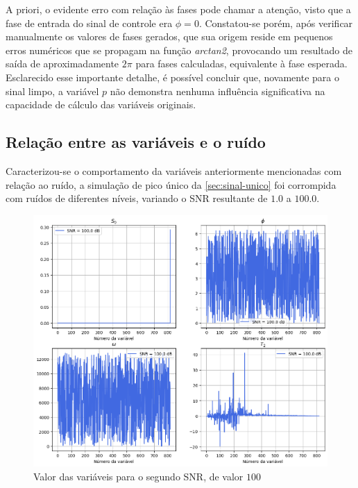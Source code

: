 \documentclass[12pt]{article}
\begin{document}
A priori, o evidente erro com relação às fases pode chamar a atenção, visto que a fase de entrada do sinal de controle era $\phi = 0$.
Constatou-se porém, após verificar manualmente os valores de fases gerados, que sua origem reside em pequenos erros numéricos que se propagam na função 
\textit{arctan2}, provocando um resultado de saída de aproximadamente $2\pi$ para fases calculadas, equivalente à fase esperada. Esclarecido esse 
importante detalhe, é possível concluir que, novamente para o sinal limpo, a variável $p$ não demonstra nenhuma influência significativa na capacidade de cálculo das 
variáveis originais.

\subsection{Relação entre as variáveis e o ruído}

Caracterizou-se o comportamento da variáveis anteriormente mencionadas com relação ao ruído, a simulação de pico único da \autoref{sec:sinal-unico} foi corrompida com
ruídos de diferentes níveis, variando o SNR resultante de $1.0$ a $100.0$. 

\begin{figure} [H]
    \centering
    \includegraphics[scale=0.625]{var-1.png}
    \caption{Valor das variáveis para o segundo SNR, de valor $100$}
    \label{fig:6}
\end{figure}
\end{document}
